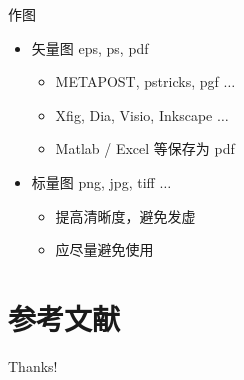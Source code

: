 \documentclass[UTF8, fontset=fandol]{beamer}
\begin{document}
  \begin{frame}{作图}
    \begin{itemize}
      \item 矢量图 eps, ps, pdf
        \begin{itemize}
          \item METAPOST, pstricks, pgf $\ldots$
          \item Xfig, Dia, Visio, Inkscape $\ldots$
          \item Matlab / Excel 等保存为 pdf
        \end{itemize}
      \item 标量图 png, jpg, tiff $\ldots$
        \begin{itemize}
          \item 提高清晰度，避免发虚
          \item 应尽量避免使用
        \end{itemize}
    \end{itemize}
  \end{frame}

  \section{参考文献}

  \begin{frame}[allowframebreaks]
    
    
  \end{frame}

  \begin{frame}
    \begin{center}
      {\Huge\calligra Thanks!}
    \end{center}
  \end{frame}
\end{document}
